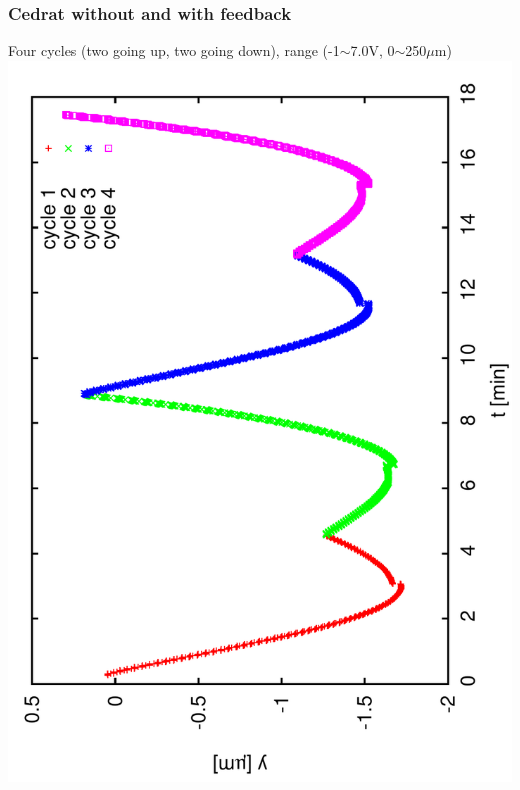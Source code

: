 \documentclass[a4paper,11pt]{book}
\begin{document}
\subsubsection{Cedrat without and with feedback}
Four cycles (two going up, two going down), range (-1$\sim$7.0V, 0$\sim$250$\mu$m)\\
\includegraphics[angle=-90,scale=0.15]{image71.pdf}
\end{document}
